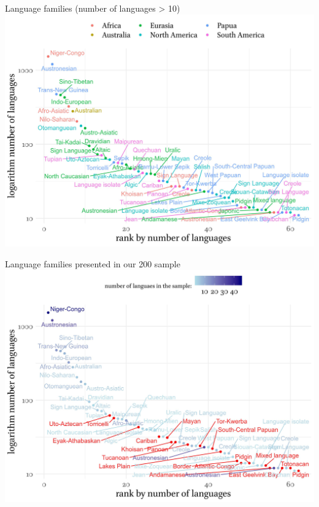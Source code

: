 \documentclass[13pt, t]{beamer}
\begin{document}
\begin{frame}{Language families (number of languages > 10)}
\includegraphics[width=\linewidth]{images/04_families_by_area}
\end{frame}

\begin{frame}{Language families presented in our 200 sample}
\includegraphics[width=\linewidth]{images/09_families_by_sample}
\end{frame}
\end{document}
